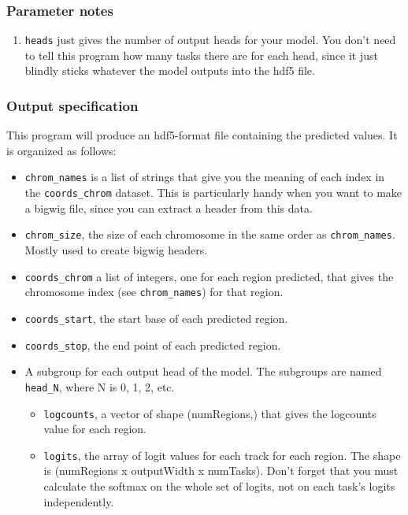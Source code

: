 \documentclass{article}
\begin{document}
\subsubsection{Parameter notes}

\begin{enumerate}
    \item \texttt{heads} just gives the number of output heads for your model. You don't need to tell this program how many tasks there are for each head, since it just blindly sticks whatever the model outputs into the hdf5 file.
\end{enumerate}

\subsubsection{Output specification}

This program will produce an hdf5-format file containing the predicted values. It is organized as follows:

\begin{itemize}
    \item \texttt{chrom\_names} is a list of strings that give you the meaning of each index in the \texttt{coords\_chrom} dataset. 
        This is particularly handy when you want to make a bigwig file, since you can extract a header from this data.
    \item \texttt{chrom\_size}, the size of each chromosome in the same order as \texttt{chrom\_names}. Mostly used to create bigwig headers.
    \item \texttt{coords\_chrom} a list of integers, one for each region predicted, that gives the chromosome index (see \texttt{chrom\_names}) for that region.
    \item \texttt{coords\_start}, the start base of each predicted region.
    \item \texttt{coords\_stop}, the end point of each predicted region.
    \item A subgroup for each output head of the model. The subgroups are named \texttt{head\_N}, where N is 0, 1, 2, etc.
        \begin{itemize}
            \item \texttt{logcounts}, a vector of shape (numRegions,) that gives the logcounts value for each region.
            \item \texttt{logits}, the array of logit values for each track for each region. The shape is (numRegions x outputWidth x numTasks). 
                Don't forget that you must calculate the softmax on the whole set of logits, not on each task's logits independently.
        \end{itemize}

\end{itemize}
\end{document}
